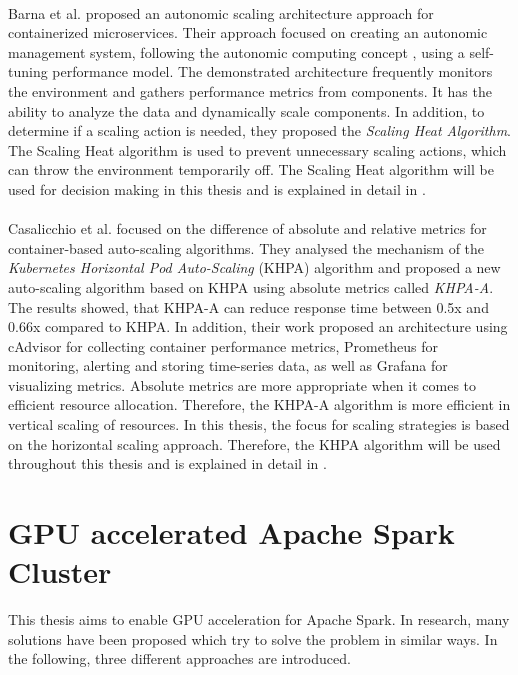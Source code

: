 \paragraph{}Barna et al. \cite{Barna2017ElasticContainerApps} proposed an autonomic scaling architecture approach for containerized microservices. Their approach focused on creating an autonomic management system, following the autonomic computing concept \cite{Kephart2003VisionComputing}, using a self-tuning performance model. The demonstrated architecture frequently monitors the environment and gathers performance metrics from components. It has the ability to analyze the data and dynamically scale components. In addition, to determine if a scaling action is needed, they proposed the \textit{Scaling Heat Algorithm}. The Scaling Heat algorithm is used to prevent unnecessary scaling actions, which can throw the environment temporarily off.
The Scaling Heat algorithm will be used for decision making in this thesis and is explained in detail in .


\paragraph{}Casalicchio et al. \cite{Casalicchio2017AutoScaleCont} focused on the difference of absolute and relative metrics for container-based auto-scaling algorithms. They analysed the mechanism of the \textit{Kubernetes Horizontal Pod Auto-Scaling} (KHPA) algorithm and proposed a new auto-scaling algorithm based on KHPA using absolute metrics called \textit{KHPA-A}. The results showed, that KHPA-A can reduce response time between 0.5x and 0.66x compared to KHPA. In addition, their work proposed an architecture using cAdvisor for collecting container performance metrics, Prometheus for monitoring, alerting and storing time-series data, as well as Grafana for visualizing metrics.
Absolute metrics are more appropriate when it comes to efficient resource allocation. Therefore, the KHPA-A algorithm is more efficient in vertical scaling of resources.
In this thesis, the focus for scaling strategies is based on the horizontal scaling approach. Therefore, the KHPA algorithm will be used throughout this thesis and is explained in detail in .


\section{GPU accelerated Apache Spark Cluster}
This thesis aims to enable GPU acceleration for Apache Spark.
In research, many solutions have been proposed which try to solve the problem in similar ways.
In the following, three different approaches are introduced.



